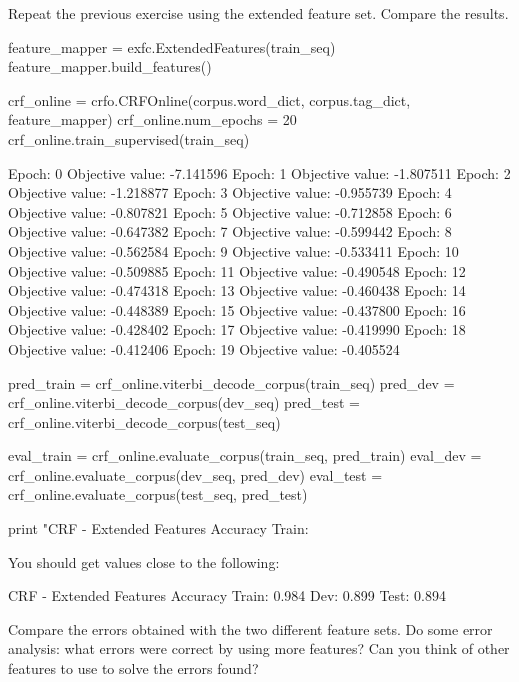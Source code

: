 \begin{exercise}\label{exer:crf2}
Repeat the previous exercise using the extended feature set. Compare the results.

\begin{python}
feature_mapper = exfc.ExtendedFeatures(train_seq)
feature_mapper.build_features()

crf_online = crfo.CRFOnline(corpus.word_dict, corpus.tag_dict, feature_mapper)
crf_online.num_epochs = 20
crf_online.train_supervised(train_seq)

Epoch: 0 Objective value: -7.141596
Epoch: 1 Objective value: -1.807511
Epoch: 2 Objective value: -1.218877
Epoch: 3 Objective value: -0.955739
Epoch: 4 Objective value: -0.807821
Epoch: 5 Objective value: -0.712858
Epoch: 6 Objective value: -0.647382
Epoch: 7 Objective value: -0.599442
Epoch: 8 Objective value: -0.562584
Epoch: 9 Objective value: -0.533411
Epoch: 10 Objective value: -0.509885
Epoch: 11 Objective value: -0.490548
Epoch: 12 Objective value: -0.474318
Epoch: 13 Objective value: -0.460438
Epoch: 14 Objective value: -0.448389
Epoch: 15 Objective value: -0.437800
Epoch: 16 Objective value: -0.428402
Epoch: 17 Objective value: -0.419990
Epoch: 18 Objective value: -0.412406
Epoch: 19 Objective value: -0.405524

pred_train = crf_online.viterbi_decode_corpus(train_seq)
pred_dev = crf_online.viterbi_decode_corpus(dev_seq)
pred_test = crf_online.viterbi_decode_corpus(test_seq)

eval_train = crf_online.evaluate_corpus(train_seq, pred_train)
eval_dev = crf_online.evaluate_corpus(dev_seq, pred_dev)
eval_test = crf_online.evaluate_corpus(test_seq, pred_test)

print "CRF - Extended Features Accuracy Train: %
\end{python}

You should get values close to the following:
\begin{python}
CRF - Extended Features Accuracy Train: 0.984 Dev: 0.899 Test: 0.894
\end{python}

Compare the errors obtained with the two different feature
sets. Do some error analysis: what errors were correct by using
more features? Can you think of other features to use to solve the
errors found?
\end{exercise}

